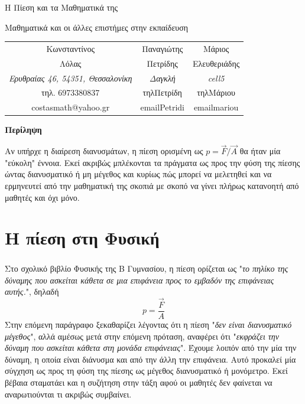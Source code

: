 \documentclass[12pt,titlepage]{article}
\begin{document}
\begin{titlepage}
 \begin{center}
  \Huge {Η Πίεση και τα Μαθηματικά της}

  \vspace{1.5cm}
  \Large {Μαθηματικά και οι άλλες επιστήμες στην εκπαίδευση}
 \end{center}
 \vspace{2cm}
 \begin{center}

  \begin{tabular}{ c c c }
   \Large{Κωνσταντίνος} & \Large{Παναγιώτης} & \Large{Μάριος} \\
   \Large{Λόλας} & \Large{Πετρίδης} & \Large{Ελευθεριάδης} \\
   \textit{Ερυθραίας 46, 54351, Θεσσαλονίκη} & \textit{Δαγκλή} & \textit{cell5} \\
   τηλ. 6973380837 & τηλΠετρίδη & τηλΜάριου \\
   costasmath@yahoo.gr & emailPetridi & emailmariou \\
  \end{tabular}

  \vspace{2cm}
  \textbf{Περίληψη}

  Αν υπήρχε η διαίρεση διανυσμάτων, η πίεση ορισμένη ως $p=\vec{F}/\vec{A}$ θα ήταν μία "εύκολη" έννοια. Εκεί ακριβώς μπλέκονται τα πράγματα ως προς την φύση της πίεσης ώντας διανυσματικό ή μη μέγεθος και κυρίως πώς μπορεί να μελετηθεί και να ερμηνευτεί από την μαθηματική της σκοπιά με σκοπό να γίνει πλήρως κατανοητή από μαθητές και όχι μόνο.

 \end{center}

\end{titlepage}

\section{Η πίεση στη Φυσική}
Στο σχολικό βιβλίο Φυσικής της Β Γυμνασίου\textsuperscript{\cite{fysikiB}}, η πίεση ορίζεται ως "\textit{το πηλίκο της δύναμης που ασκείται κάθετα σε μια επιφάνεια προς το εμβαδόν της επιφάνειας αυτής.}", δηλαδή
\begin{equation} \label{eq:1}
 p=\frac{\vec{F}}{A}
\end{equation}
Στην επόμενη παράγραφο ξεκαθαρίζει λέγοντας ότι η πίεση "\textit{δεν είναι διανυσματικό μέγεθος}", αλλά αμέσως μετά στην επόμενη πρόταση, αναφέρει ότι "\textit{εκφράζει την δύναμη που ασκείται κάθετα στη μονάδα επιφάνειας}". Έχουμε λοιπόν από την μία την δύναμη, η οποία είναι διάνυσμα και από την άλλη την επιφάνεια. Αυτό προκαλεί μία σύγχηση ως προς τη φύση της πίεσης ως μέγεθος διανυσματικό ή μονόμετρο. Εκεί βέβαια σταματάει και η συζήτηση στην τάξη αφού οι μαθητές δεν φαίνεται να αναρωτιούνται τι ακριβώς συμβαίνει.
\end{document}
